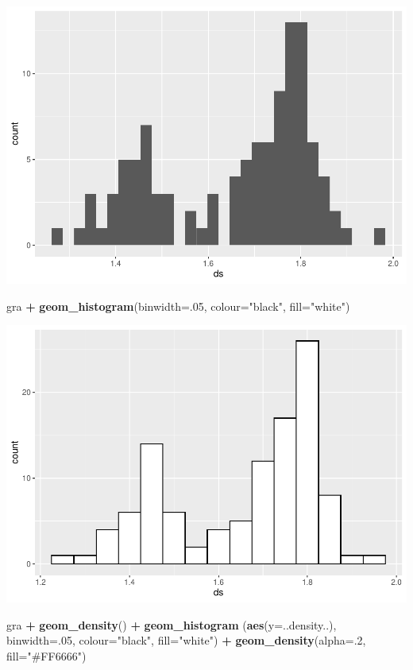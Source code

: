 \documentclass[]{book}
\newenvironment{Shaded}{\begin{snugshade}}{\end{snugshade}}
\newcommand{\DataTypeTok}[1]{\textcolor[rgb]{0.13,0.29,0.53}{#1}}
\newcommand{\DecValTok}[1]{\textcolor[rgb]{0.00,0.00,0.81}{#1}}
\newcommand{\KeywordTok}[1]{\textcolor[rgb]{0.13,0.29,0.53}{\textbf{#1}}}
\newcommand{\NormalTok}[1]{#1}
\newcommand{\OperatorTok}[1]{\textcolor[rgb]{0.81,0.36,0.00}{\textbf{#1}}}
\newcommand{\StringTok}[1]{\textcolor[rgb]{0.31,0.60,0.02}{#1}}
\begin{document}
\includegraphics{TudodoR_files/figure-latex/unnamed-chunk-192-1.pdf}

\begin{Shaded}
\begin{Highlighting}[]
\NormalTok{gra }\OperatorTok{+}\StringTok{  }\KeywordTok{geom_histogram}\NormalTok{(}\DataTypeTok{binwidth=}\NormalTok{.}\DecValTok{05}\NormalTok{, }\DataTypeTok{colour=}\StringTok{"black"}\NormalTok{, }\DataTypeTok{fill=}\StringTok{"white"}\NormalTok{)}
\end{Highlighting}
\end{Shaded}

\includegraphics{TudodoR_files/figure-latex/unnamed-chunk-193-1.pdf}

\begin{Shaded}
\begin{Highlighting}[]
\NormalTok{gra }\OperatorTok{+}\StringTok{ }\KeywordTok{geom_density}\NormalTok{() }\OperatorTok{+}\StringTok{ }
\StringTok{  }\KeywordTok{geom_histogram}\NormalTok{ (}\KeywordTok{aes}\NormalTok{(}\DataTypeTok{y=}\NormalTok{..density..),              }\DataTypeTok{binwidth=}\NormalTok{.}\DecValTok{05}\NormalTok{,}
    \DataTypeTok{colour=}\StringTok{"black"}\NormalTok{, }\DataTypeTok{fill=}\StringTok{"white"}\NormalTok{) }\OperatorTok{+}
\StringTok{    }\KeywordTok{geom_density}\NormalTok{(}\DataTypeTok{alpha=}\NormalTok{.}\DecValTok{2}\NormalTok{, }\DataTypeTok{fill=}\StringTok{"#FF6666"}\NormalTok{)}
\end{Highlighting}
\end{Shaded}
\end{document}
